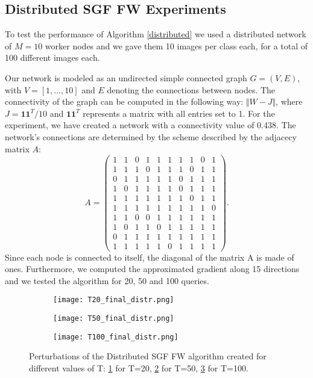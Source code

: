 \subsection{Distributed SGF FW Experiments}
To test the performance of Algorithm \ref{distributed} we used a distributed network of $M=10$ worker nodes and we
gave them 10 images per class each, for a total of 100 different images each.

Our network is modeled as an undirected simple connected graph $G = (V,E)$, with $V = [1,...,10]$ and $E$ denoting
the connections between nodes. The connectivity of the graph can be computed in the following way: $\Vert W- J \Vert$,
where $J= \mathbf{11}^T/10$ and $\mathbf{11}^T$ represents a matrix with all entries set to 1. For the experiment, we have created a network
with a connectivity value of 0.438. The network's connections are determined by the scheme described by the adjacecy
matrix $A$:
\[ A =
\begin{pmatrix}
1& 1& 0& 1& 1& 1& 1& 1& 0& 1\\
1& 1& 1& 0& 1& 1& 1& 0& 1& 1\\
0& 1& 1& 1& 1& 1& 0& 1& 1& 1\\
1& 0& 1& 1& 1& 1& 0& 1& 1& 1\\
1& 1& 1& 1& 1& 1& 1& 0& 1& 1\\
1& 1& 1& 1& 1& 1& 1& 1& 1& 0\\
1& 1& 0& 0& 1& 1& 1& 1& 1& 1\\
1& 0& 1& 1& 0& 1& 1& 1& 1& 1\\
0& 1& 1& 1& 1& 1& 1& 1& 1& 1\\
1& 1& 1& 1& 1& 0& 1& 1& 1& 1
\end{pmatrix}
.\]
Since each node is connected to itself, the diagonal of the matrix A is made of ones.
 Furthermore, we computed the approximated gradient along 15 directions and we tested
the algorithm for 20, 50 and 100 queries.

\begin{figure}%
	\centering
	\begin{subfigure}[b]{0.15\textwidth}
		\centering
		\texttt{[image: T20\_final\_distr.png]}
		\caption{}
		\label{fig:distributed_perturbation_20}
	\end{subfigure}
	\hfill
	\begin{subfigure}[b]{0.15\textwidth}
		\texttt{[image: T50\_final\_distr.png]}
		\caption{}
		\label{fig:variance-distributed_perturbation_50}
	\end{subfigure}
	\hfill
	\begin{subfigure}[b]{0.15\textwidth}
		\texttt{[image: T100\_final\_distr.png]}
		\caption{}
		\label{fig:distributed_perturbation_100}
	\end{subfigure}
	\caption{Perturbations of the Distributed SGF FW algorithm created for different values of T:
	  \ref{fig:distributed_perturbation_20} for T=20, \ref{fig:variance-distributed_perturbation_50} for T=50, \ref{fig:distributed_perturbation_100} for T=100.}
	\label{fig:perturbations}
\end{figure}

